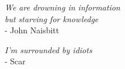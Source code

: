 \vspace{30pt}
\emph{We are drowning in information} \\\vspace{6pt}
\emph{but starving for knowledge}
\\\vspace{20pt}
 - John Naisbitt

 \vspace{50pt}
 \emph{I'm surrounded by idiots}
 \\\vspace{20pt}
  - Scar
